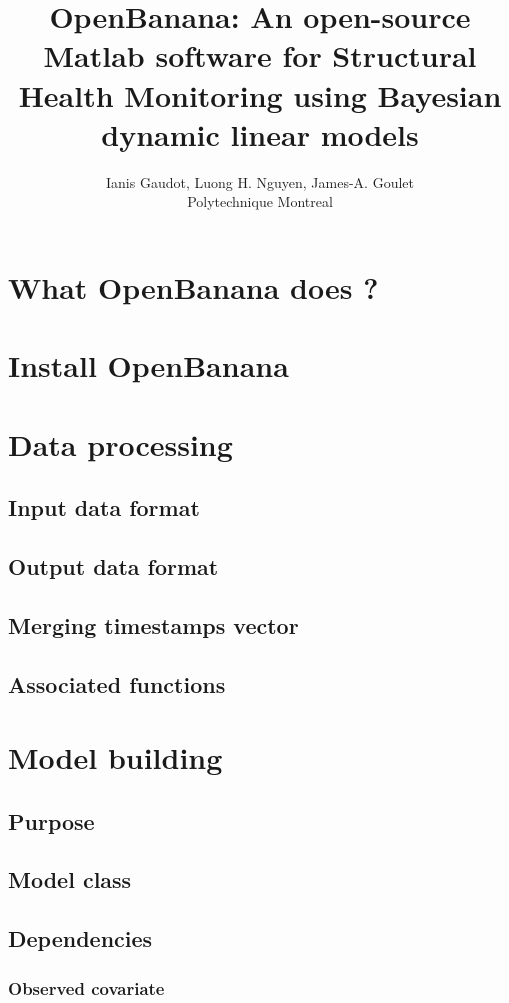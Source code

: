 \documentclass{book}
\title{OpenBanana: An open-source Matlab software for Structural Health Monitoring using Bayesian dynamic linear models}
\author{Ianis Gaudot, Luong H. Nguyen, James-A. Goulet \\ Polytechnique Montreal}
\begin{document}
\maketitle

\tableofcontents

\chapter{What OpenBanana does ?}
\newpage

\chapter{Install OpenBanana}
\newpage

\chapter{Data processing}
\section{Input data format}
\section{Output data format}
\section{Merging timestamps vector}
\section{Associated functions}
\newpage

\chapter{Model building}
\section{Purpose}
\section{Model class}
\section{Dependencies}
\subsection{Observed covariate}
\end{document}
